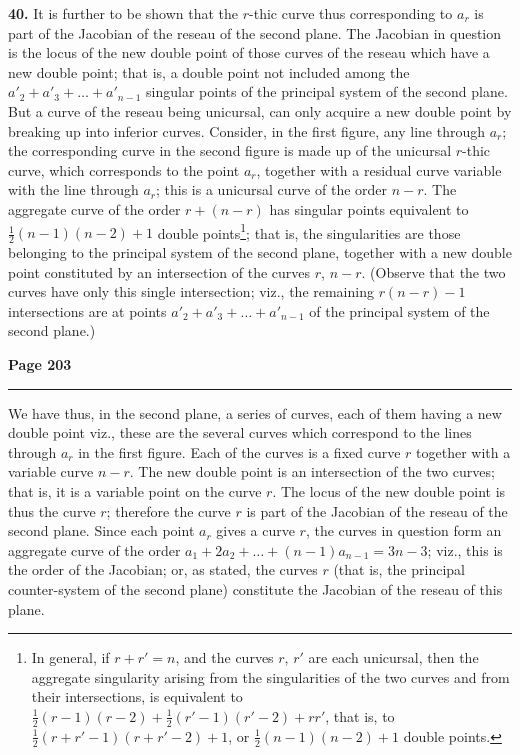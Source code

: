 \documentclass[12pt,a4paper]{article}
\theoremstyle{plain}
\theoremstyle{definition}
\theoremstyle{remark}
\begin{document}
\textbf{40.} It is further to be shown that the $r$-thic curve thus corresponding to $a_r$ is part of the Jacobian of the reseau of the second plane. The Jacobian in question is the locus of the new double point of those curves of the reseau which have a new double point; that is, a double point not included among the $a'_2 + a'_3 + \ldots + a'_{n-1}$ singular points of the principal system of the second plane. But a curve of the reseau being unicursal, can only acquire a new double point by breaking up into inferior curves. Consider, in the first figure, any line through $a_r$; the corresponding curve in the second figure is made up of the unicursal $r$-thic curve, which corresponds to the point $a_r$, together with a residual curve variable with the line through $a_r$; this is a unicursal curve of the order $n - r$. The aggregate curve of the order $r + (n - r)$ has singular points equivalent to $\frac{1}{2}(n-1)(n-2) + 1$ double points\footnote{In general, if $r + r' = n$, and the curves $r$, $r'$ are each unicursal, then the aggregate singularity arising from the singularities of the two curves and from their intersections, is equivalent to $\frac{1}{2}(r-1)(r-2) + \frac{1}{2}(r'-1)(r'-2) + rr'$, that is, to $\frac{1}{2}(r + r' - 1)(r + r' - 2) + 1$, or $\frac{1}{2}(n-1)(n-2) + 1$ double points.}; that is, the singularities are those belonging to the principal system of the second plane, together with a new double point constituted by an intersection of the curves $r$, $n - r$. (Observe that the two curves have only this single intersection; viz., the remaining $r(n - r) - 1$ intersections are at points $a'_2 + a'_3 + \ldots + a'_{n-1}$ of the principal system of the second plane.)

\newpage
\noindent\textbf{Page 203}\\
\noindent\rule{\textwidth}{0.4pt}

\smallskip

\noindent We have thus, in the second plane, a series of curves, each of them having a new double point viz., these are the several curves which correspond to the lines through $a_r$ in the first figure. Each of the curves is a fixed curve $r$ together with a variable curve $n - r$. The new double point is an intersection of the two curves; that is, it is a variable point on the curve $r$. The locus of the new double point is thus the curve $r$; therefore the curve $r$ is part of the Jacobian of the reseau of the second plane. Since each point $a_r$ gives a curve $r$, the curves in question form an aggregate curve of the order $a_1 + 2a_2 + \ldots + (n-1)a_{n-1} = 3n - 3$; viz., this is the order of the Jacobian; or, as stated, the curves $r$ (that is, the principal counter-system of the second plane) constitute the Jacobian of the reseau of this plane.
\end{document}
